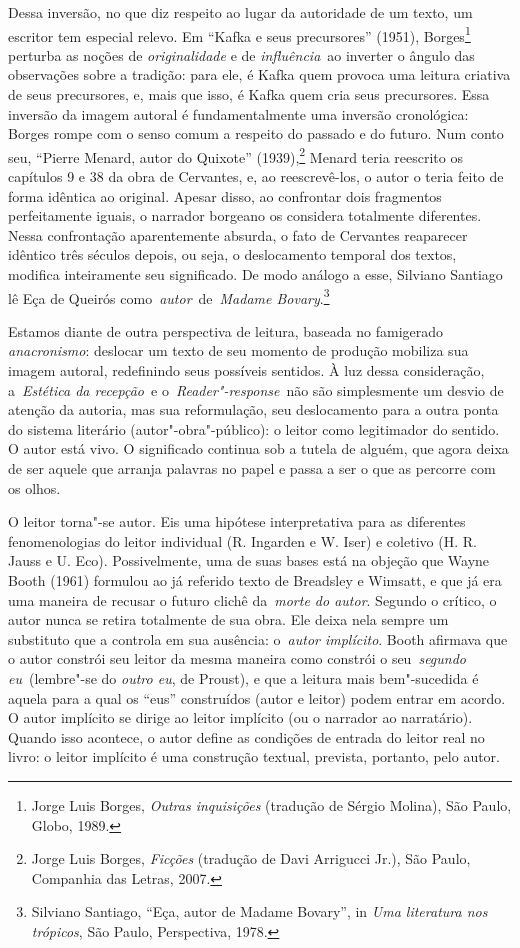 Dessa inversão, no que diz respeito ao lugar da autoridade de um texto,
um escritor tem especial relevo. Em ``Kafka e seus precursores'' (1951),
Borges\footnote{Jorge Luis Borges, \emph{Outras inquisições} (tradução
  de Sérgio Molina), São Paulo, Globo, 1989.} perturba as noções de
\emph{originalidade} e de \emph{influência}~ao inverter o ângulo das
observações sobre a tradição: para ele, é Kafka quem provoca uma leitura
criativa de seus precursores, e, mais que isso, é Kafka quem cria seus
precursores. Essa inversão da imagem autoral é fundamentalmente uma
inversão cronológica: Borges rompe com o senso comum a respeito do
passado e do futuro. Num conto seu, ``Pierre Menard, autor do Quixote''
(1939),\footnote{Jorge Luis Borges, \emph{Ficções} (tradução de Davi
  Arrigucci Jr.), São Paulo, Companhia das Letras, 2007.} Menard teria
reescrito os capítulos 9 e 38 da obra de Cervantes, e, ao reescrevê-los,
o autor o teria feito de forma idêntica ao original. Apesar disso, ao
confrontar dois fragmentos perfeitamente iguais, o narrador borgeano os
considera totalmente diferentes. Nessa confrontação aparentemente
absurda, o fato de Cervantes reaparecer idêntico três séculos depois, ou
seja, o deslocamento temporal dos textos, modifica inteiramente seu
significado. De modo análogo a esse, Silviano Santiago lê Eça de Queirós
como~\emph{autor}~de~\emph{Madame Bovary}.\footnote{Silviano Santiago,
  ``Eça, autor de Madame Bovary'', in \emph{Uma literatura nos
  trópicos}, São Paulo, Perspectiva, 1978.}

Estamos diante de outra perspectiva de leitura, baseada no famigerado
\emph{anacronismo}: deslocar um texto de seu momento de produção
mobiliza sua imagem autoral, redefinindo seus possíveis sentidos. À luz
dessa consideração, a~\emph{Estética da recepção}~e
o~\emph{Reader"-response}~não são simplesmente um desvio de atenção da
autoria, mas sua reformulação, seu deslocamento para a outra ponta do
sistema literário (autor"-obra"-público): o leitor como legitimador do
sentido. O autor está vivo. O significado continua sob a tutela de
alguém, que agora deixa de ser aquele que arranja palavras no papel e
passa a ser o que as percorre com os olhos.

O leitor torna"-se autor. Eis uma hipótese interpretativa para as
diferentes fenomenologias do leitor individual (R. Ingarden e W. Iser) e
coletivo (H. R. Jauss e U. Eco). Possivelmente, uma de suas bases está
na objeção que Wayne Booth (1961) formulou ao já referido texto de
Breadsley e Wimsatt, e que já era uma maneira de recusar o futuro clichê
da~\emph{morte do autor}. Segundo o crítico, o autor nunca se retira
totalmente de sua obra. Ele deixa nela sempre um substituto que a
controla em sua ausência: o~\emph{autor implícito}. Booth afirmava que o
autor constrói seu leitor da mesma maneira como constrói o
seu~\emph{segundo eu}~(lembre"-se do \emph{outro eu}, de Proust), e que a
leitura mais bem"-sucedida é aquela para a qual os ``eus'' construídos
(autor e leitor) podem entrar em acordo. O autor implícito se dirige ao
leitor implícito (ou o narrador ao narratário). Quando isso acontece, o
autor define as condições de entrada do leitor real no livro: o leitor
implícito é uma construção textual, prevista, portanto, pelo autor.

